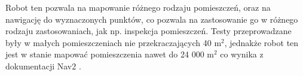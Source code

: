 \documentclass[a4paper,twoside,12pt]{book}
\begin{document}
Robot ten pozwala na mapowanie różnego rodzaju pomieszczeń, oraz na nawigację do wyznaczonych punktów, co pozwala na zastosowanie go w różnego rodzaju zastosowaniach, jak np. inspekcja pomieszczeń. Testy przeprowadzane były w małych pomieszczeniach nie przekraczających 40 m$^2$, jednakże robot ten jest w stanie mapować pomieszczenia nawet do 24 000 m$^2$ co wynika z dokumentacji Nav2 \cite{bib:abs-2003-00368}.
%
%
%
%
%        


%
\end{document}
